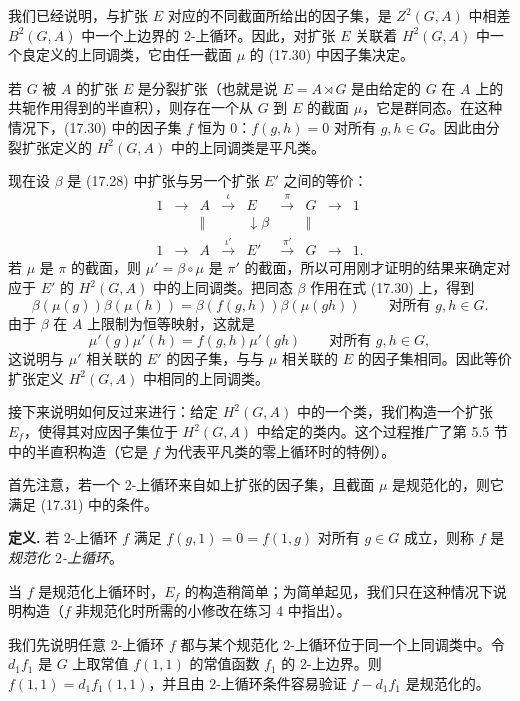 我们已经说明，与扩张 $E$ 对应的不同截面所给出的因子集，是 $Z^2(G,A)$ 中相差 $B^2(G,A)$ 中一个上边界的 $2$-上循环。因此，对扩张 $E$ 关联着 $H^2(G,A)$ 中一个良定义的上同调类，它由任一截面 $\mu$ 的 (17.30) 中因子集决定。

若 $G$ 被 $A$ 的扩张 $E$ 是分裂扩张（也就是说 $E=A\rtimes G$ 是由给定的 $G$ 在 $A$ 上的共轭作用得到的半直积），则存在一个从 $G$ 到 $E$ 的截面 $\mu$，它是群同态。在这种情况下，(17.30) 中的因子集 $f$ 恒为 $0$：$f(g,h)=0$ 对所有 $g,h\in G$。因此由分裂扩张定义的 $H^2(G,A)$ 中的上同调类是平凡类。

现在设 $\beta$ 是 (17.28) 中扩张与另一个扩张 $E'$ 之间的等价：
\[
\begin{array}{ccccccccc}
1&\longrightarrow&A&\xrightarrow{\iota}&E&\xrightarrow{\pi}&G&\longrightarrow&1\\
 &&\Vert&&\downarrow\beta&&\Vert&&\\
1&\longrightarrow&A&\xrightarrow{\iota'}&E'&\xrightarrow{\pi'}&G&\longrightarrow&1.
\end{array}
\]
若 $\mu$ 是 $\pi$ 的截面，则 $\mu'=\beta\circ\mu$ 是 $\pi'$ 的截面，所以可用刚才证明的结果来确定对应于 $E'$ 的 $H^2(G,A)$ 中的上同调类。把同态 $\beta$ 作用在式 (17.30) 上，得到
\[
  \beta(\mu(g))\beta(\mu(h))=\beta(f(g,h))\beta(\mu(gh))
  \qquad\text{对所有 }g,h\in G.
\]
由于 $\beta$ 在 $A$ 上限制为恒等映射，这就是
\[
  \mu'(g)\mu'(h)=f(g,h)\mu'(gh)
  \qquad\text{对所有 }g,h\in G,
\]
这说明与 $\mu'$ 相关联的 $E'$ 的因子集，与与 $\mu$ 相关联的 $E$ 的因子集相同。因此等价扩张定义 $H^2(G,A)$ 中相同的上同调类。

接下来说明如何反过来进行：给定 $H^2(G,A)$ 中的一个类，我们构造一个扩张 $E_f$，使得其对应因子集位于 $H^2(G,A)$ 中给定的类内。这个过程推广了第 5.5 节中的半直积构造（它是 $f$ 为代表平凡类的零上循环时的特例）。

首先注意，若一个 $2$-上循环来自如上扩张的因子集，且截面 $\mu$ 是规范化的，则它满足 (17.31) 中的条件。

\noindent\textbf{定义.} 若 $2$-上循环 $f$ 满足 $f(g,1)=0=f(1,g)$ 对所有 $g\in G$ 成立，则称 $f$ 是\emph{规范化 $2$-上循环}。

当 $f$ 是规范化上循环时，$E_f$ 的构造稍简单；为简单起见，我们只在这种情况下说明构造（$f$ 非规范化时所需的小修改在练习 4 中指出）。

我们先说明任意 $2$-上循环 $f$ 都与某个规范化 $2$-上循环位于同一个上同调类中。令 $d_1f_1$ 是 $G$ 上取常值 $f(1,1)$ 的常值函数 $f_1$ 的 $2$-上边界。则 $f(1,1)=d_1f_1(1,1)$，并且由 $2$-上循环条件容易验证 $f-d_1f_1$ 是规范化的。

